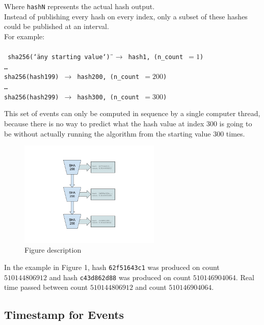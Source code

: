 \documentclass[12pt]{article}
\begin{document}
\noindent Where \texttt{hashN} represents the actual hash output. \\

Instead of publishing every hash on every index, only a subset of
these hashes could be published at an interval.\\

\noindent For example:\\\\\noindent
\texttt{
 sha256(\char`\"any starting value\char`\") $\rightarrow$ hash1, (n\_count~$=1$)\\
\ldots\\
sha256(hash199) $\rightarrow$ hash200, (n\_count~$=200$)\\
\ldots\\
sha256(hash299) $\rightarrow$ hash300, (n\_count~$=300$)\\
}

This set of events can only be computed in sequence by a single computer thread, because there is no way to predict what the hash value at index $300$ is going to be without actually running the algorithm from the starting value $300$ times.

\begin{figure}
  \begin{center}
    \centering
    \includegraphics[width=0.6\textwidth]{figures/fig_2.png}
    \caption[Fig 2]{Figure description \label{fig_2}}
  \end{center}
  \end{figure}

In the example in Figure 1, hash \texttt{62f51643c1} was produced on
count $510144806912$ and hash \texttt{c43d862d88} was produced on
count $510146904064$. Real time passed between count $510144806912$
and count $510146904064$.

\subsection{Timestamp for Events}
\end{document}

